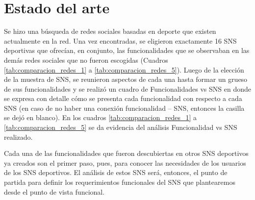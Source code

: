 \section{Estado del arte} \label{cap:estado_arte}

Se hizo una búsqueda de redes sociales basadas en deporte que existen actualmente en la red. Una vez encontradas, se eligieron exactamente 16 SNS deportivas que ofrecían, en conjunto, las funcionalidades que se observaban en las demás redes sociales que no fueron escogidas (Cuadros \ref{tab:comparacion_redes_1} a \ref{tab:comparacion_redes_5}). Luego de la elección de la muestra de SNS, se reunieron aspectos de cada una hasta formar un grueso de sus funcionalidades y se realizó un cuadro de Funcionalidades vs SNS en donde se expresa con detalle cómo se presenta cada funcionalidad con respecto a cada SNS (en caso de no haber una conexión funcionalidad – SNS, entonces la casilla se dejó en blanco). En los cuadros \ref{tab:comparacion_redes_1} a \ref{tab:comparacion_redes_5} se da evidencia del análisis Funcionalidad vs SNS realizado.

Cada una de las funcionalidades que fueron descubiertas en otros SNS deportivos ya creados son el primer paso, pues, para conocer las necesidades de los usuarios de los SNS deportivos. El análisis de estos SNS será, entonces, el punto de partida para definir los requerimientos funcionales del SNS que plantearemos desde el punto de vista funcional.

